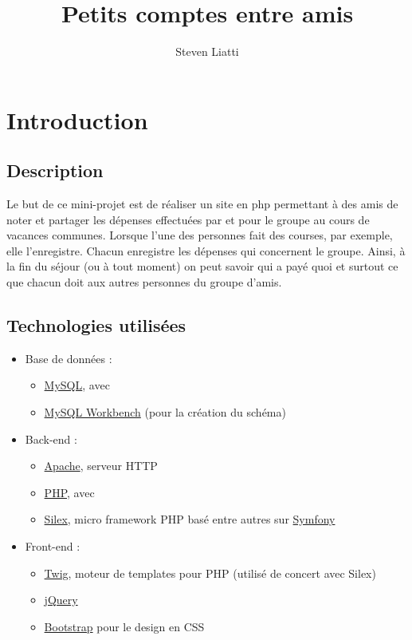\documentclass[a4paper, 12pt]{article}
\begin{document}
\title{Petits comptes entre amis} 
\author{Steven Liatti} 
\maketitle

\tableofcontents 
\listoffigures
\renewcommand\listoflistingscaption{Table des listings de code source}
\listoflistings

\section{Introduction}
\subsection{Description}
Le but de ce mini-projet est de réaliser un site en php permettant à des amis de noter et
partager les dépenses effectuées par et pour le groupe au cours de vacances
communes. Lorsque l’une des personnes fait des courses, par exemple, elle l’enregistre.
Chacun enregistre les dépenses qui concernent le groupe. Ainsi, à la fin du séjour (ou à
tout moment) on peut savoir qui a payé quoi et surtout ce que chacun doit aux autres
personnes du groupe d’amis.

\subsection{Technologies utilisées}
\begin{itemize}
	\item Base de données :
	\begin{itemize}
		\item \href{https://www.mysql.com/}{MySQL}, avec
		\item \href{https://www.mysql.com/products/workbench/}{MySQL Workbench} (pour la création du schéma)
	\end{itemize}
	\item Back-end :
	\begin{itemize}
		\item \href{https://httpd.apache.org/}{Apache}, serveur HTTP
		\item \href{http://php.net/}{PHP}, avec
		\item \href{https://silex.symfony.com/}{Silex}, micro framework PHP basé entre autres sur \href{https://symfony.com/}{Symfony}
	\end{itemize}
	\item Front-end :
	\begin{itemize}
		\item \href{https://twig.symfony.com/}{Twig}, moteur de templates pour PHP (utilisé de concert avec Silex)
		\item \href{https://jquery.org/}{jQuery}
		\item \href{http://getbootstrap.com/}{Bootstrap} pour le design en CSS
	\end{itemize}
\end{itemize}
\end{document}
